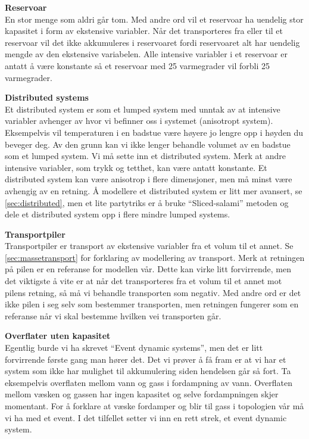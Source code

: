 \textbf{Reservoar} \\
En stor menge som aldri går tom. Med andre ord vil et reservoar ha uendelig stor kapasitet i form av ekstensive variabler. Når det transporteres fra eller til et reservoar vil det ikke akkumuleres i reservoaret fordi reservoaret alt har uendelig mengde av den ekstensive variabelen. Alle intensive variabler i et reservoar er antatt å være konstante så et reservoar med 25 varmegrader vil forbli 25 varmegrader.

\textbf{Distributed systems}\\
Et distributed system er som et lumped system med unntak av at intensive variabler avhenger av hvor vi befinner oss i systemet (anisotropt system). Eksempelvis vil temperaturen i en badstue være høyere jo lengre opp i høyden du beveger deg. Av den grunn kan vi ikke lenger behandle volumet av en badstue som et lumped system. Vi må sette inn et distributed system. Merk at andre intensive variabler, som trykk og tetthet, kan være antatt konstante. Et distributed system kan være anisotrop i flere dimensjoner, men må minst være avhengig av en retning. Å modellere et distributed system er litt mer avansert, se \cref{sec:distributed}, men et lite partytriks er å bruke ``Sliced-salami'' metoden og dele et distributed system opp i flere mindre lumped systems. 


\textbf{Transportpiler}\\
Transportpiler er transport av ekstensive variabler fra et volum til et annet. Se \cref{sec:massetransport} for forklaring av modellering av transport. Merk at retningen på pilen er en referanse for modellen vår. Dette kan virke litt forvirrende, men det viktigste å vite er at når det transporteres fra et volum til et annet mot pilens retning, så må vi behandle transporten som negativ. Med andre ord er det ikke pilen i seg selv som bestemmer transporten, men retningen fungerer som en referanse når vi skal bestemme hvilken vei transporten går. 

\textbf{Overflater uten kapasitet}\\
Egentlig burde vi ha skrevet ``Event dynamic systems'', men det er litt forvirrende første gang man hører det. Det vi prøver å få fram er at vi har et system som ikke har mulighet til akkumulering siden hendelsen går så fort. Ta eksempelvis overflaten mellom vann og gass i fordampning av vann. Overflaten mellom væsken og gassen har ingen kapasitet og selve fordampningen skjer momentant. For å forklare at væske fordamper og blir til gass i topologien vår må vi ha med et event. I det tilfellet setter vi inn en rett strek, et event dynamic system. 

